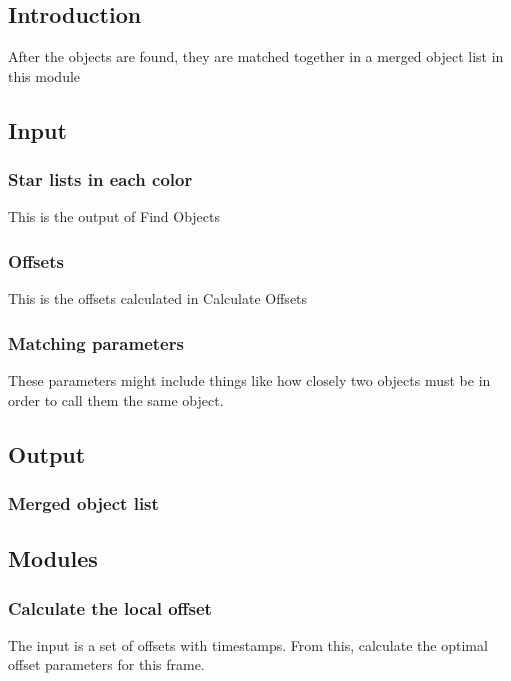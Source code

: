 
\subsection{Introduction}

After the objects are found, they are matched together in a merged object
list in this module

\subsection{Input}

\subsubsection{Star lists in each color}

This is the output of Find Objects

\subsubsection{Offsets}

This is the offsets calculated in Calculate Offsets

\subsubsection{Matching parameters}

These parameters might include things like how closely two objects must
be in order to call them the same object.

\subsection{Output}

\subsubsection{Merged object list}

\subsection{Modules}

\subsubsection{Calculate the local offset}

The input is a set of offsets with timestamps.  From this, calculate the
optimal offset parameters for this frame.

